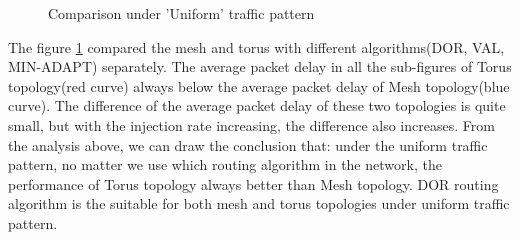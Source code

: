 \begin{figure}[H]
    \centering
    \caption{Comparison under 'Uniform' traffic pattern}
    \label{fig:com_uniform}
\end{figure}

The figure \ref{fig:com_uniform} compared the mesh and torus with different algorithms(DOR, VAL, MIN-ADAPT) separately. The average packet delay in all the sub-figures of Torus topology(red curve) always below the average packet delay of Mesh topology(blue curve). The difference of the average packet delay of these two topologies is quite small, but with the injection rate increasing, the difference also increases.
From the analysis above, we can draw the conclusion that: under the uniform traffic pattern, no matter we use which routing algorithm in the network, the performance of Torus topology always better than Mesh topology.
DOR routing algorithm is the suitable for both mesh and torus topologies under uniform traffic pattern.















